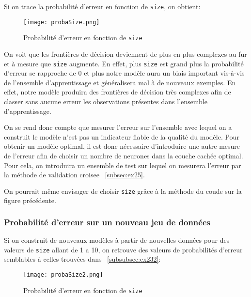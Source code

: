 \documentclass{article}
\begin{document}
\begin{multicols}{2}
Si on trace la probabilité d'erreur en fonction de \texttt{size}, on obtient:

\begin{figure}[H]
    \begin{center}
        \texttt{[image: probaSize.png]}
        \centering
        \captionsetup{justification=centering}
        \caption{\label{fig:probaSize}Probabilité d'erreur en fonction de \texttt{size}}
    \end{center}
\end{figure}

On voit que les frontières de décision deviennent de plus en plus complexes
au fur et à mesure que \texttt{size} augmente. En effet, plus \texttt{size} est
grand plus la probabilité d'erreur se rapproche de 0 et plus notre modèle aura
un biais important vis-à-vis de l'ensemble d'apprentissage et généralisera mal à
de nouveaux exemples. En effet, notre modèle produira des frontières de décision
très complexes afin de classer sans aucune erreur les observations présentes
dans l'ensemble d'apprentissage.

On se rend donc compte que mesurer l'erreur sur l'ensemble avec lequel on a
construit le modèle n'est pas un indicateur fiable de la qualité du modèle.
Pour obtenir un modèle optimal, il est donc nécessaire d'introduire une autre
mesure de l'erreur afin de choisir un nombre de neurones dans la couche cachée
optimal. Pour cela, on introduira un ensemble de test sur lequel on mesurera
l'erreur par la méthode de validation croisee ~\ref{subsec:ex25}.

On pourrait même envisager de choisir \texttt{size} grâce à la méthode du coude
sur la figure précédente.

\subsubsection{Probabilité d'erreur sur un nouveau jeu de données}\label{subsubsec:ex233}

Si on construit de nouveaux modèles à partir de nouvelles données pour des
valeurs de \texttt{size} allant de 1 a 10, on retrouve des valeurs de
probabilités d'erreur semblables à celles trouvées dans ~\ref{subsubsec:ex232}:

\begin{figure}[H]
    \begin{center}
        \texttt{[image: probaSize2.png]}
        \centering
        \captionsetup{justification=centering}
        \caption{\label{fig:probaSize2}Probabilité d'erreur en fonction de \texttt{size}}
    \end{center}
\end{figure}


\end{multicols}
\end{document}
